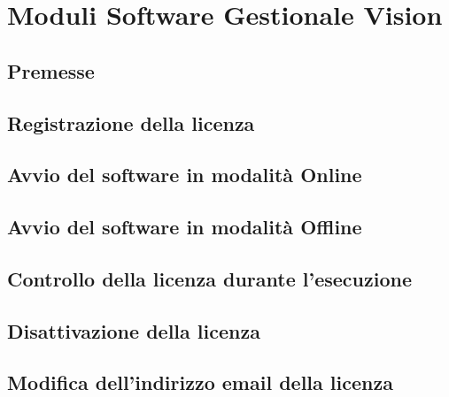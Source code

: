 
\chapter{Moduli Software Gestionale Vision}
\label{cap:moduli-vision}



\section{Premesse}


\section{Registrazione della licenza}


\section{Avvio del software in modalità Online}


\section{Avvio del software in modalità Offline}


\section{Controllo della licenza durante l'esecuzione}


\section{Disattivazione della licenza}


\section{Modifica dell'indirizzo email della licenza}